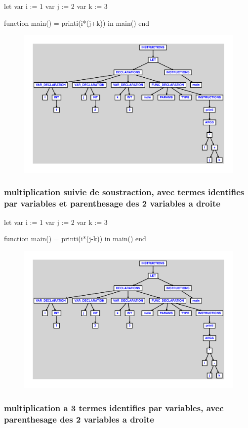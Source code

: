 \documentclass{article}
\begin{document}
\begin{verbatimtab}
let
	var i := 1
	var j := 2
	var k := 3

	function main() = printi(i*(j+k))
in main() end
\end{verbatimtab}
\begin{figure}[H]\centering\includegraphics[max width=\textwidth]{ast/ast_115.pdf}\end{figure}\subsubsection{multiplication suivie de soustraction, avec termes identifies par variables et parenthesage des 2 variables a droite}
\begin{verbatimtab}
let
	var i := 1
	var j := 2
	var k := 3

	function main() = printi(i*(j-k))
in main() end
\end{verbatimtab}
\begin{figure}[H]\centering\includegraphics[max width=\textwidth]{ast/ast_116.pdf}\end{figure}\subsubsection{multiplication a 3 termes identifies par variables, avec parenthesage des 2 variables a droite}
\end{document}
